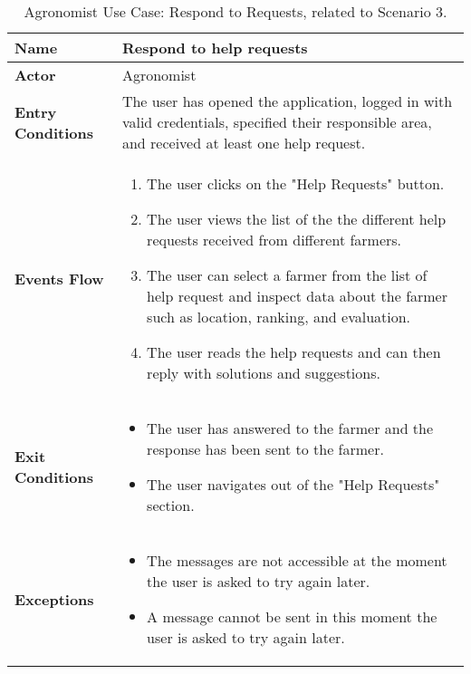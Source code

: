 
\begin{table}[hbt!]
\centering
\small
\caption{\label{tab:agrRespondHelp}Agronomist Use Case: Respond to Requests, related to Scenario 3.}
\renewcommand{\arraystretch}{1.25}
\begin{tabular}{|l|>{\raggedright\arraybackslash}m{12cm}|}

    \hline
    \textbf{Name} & Respond to help requests\\
    \hline
   	\textbf{Actor} & Agronomist\\
    \hline
    \textbf{Entry Conditions} & The user has opened the application, logged in with valid credentials, specified their responsible area, and received at least one help request.\\
    \hline
    \textbf{Events Flow} & \begin{enumerate}
            \item The user clicks on the "Help Requests" button.
            \item The user views the list of the the different help requests received from different farmers.
            \item The user can select a farmer from the list of help request and inspect data about the farmer such as location, ranking, and evaluation.
            \item The user reads the help requests and can then reply with solutions and suggestions.
       \end{enumerate}\\
    \hline
    \textbf{Exit Conditions} & \begin{itemize}
    	\item The user has answered to the farmer and the response has been sent to the farmer.
    	\item The user navigates out of the "Help Requests" section.
    \end{itemize}\\
    \hline
    \textbf{Exceptions} & 
       \begin{itemize}
          \item The messages are not accessible at the moment the user is asked to try again later.
          \item A message cannot be sent in this moment the user is asked to try again later.
        \end{itemize}
     \\
    \hline
\end{tabular}
\end{table}